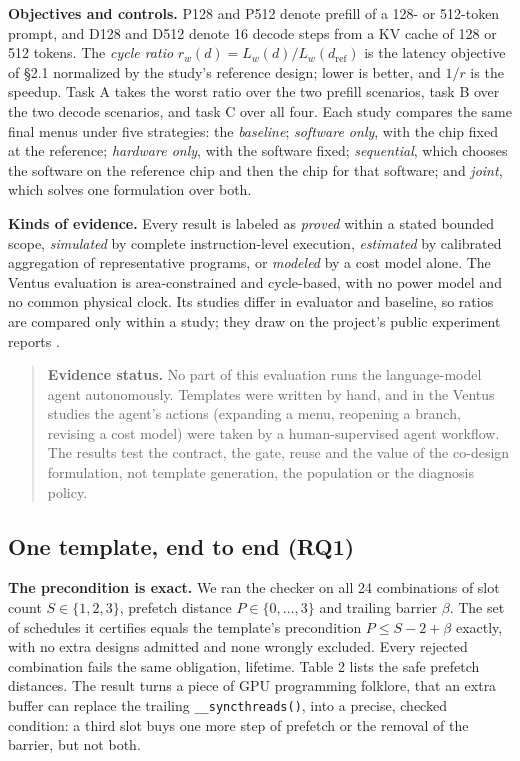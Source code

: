 \documentclass[11pt]{article}
\begin{document}
\textbf{Objectives and controls.} P128 and P512 denote prefill of a 128- or 512-token prompt, and D128 and D512 denote 16 decode steps from a KV cache of 128 or 512 tokens. The \emph{cycle ratio} \(r_w(d)=L_w(d)/L_w(d_{\mathrm{ref}})\) is the latency objective of §2.1 normalized by the study's reference design; lower is better, and \(1/r\) is the speedup. Task A takes the worst ratio over the two prefill scenarios, task B over the two decode scenarios, and task C over all four. Each study compares the same final menus under five strategies: the \emph{baseline}; \emph{software only}, with the chip fixed at the reference; \emph{hardware only}, with the software fixed; \emph{sequential}, which chooses the software on the reference chip and then the chip for that software; and \emph{joint}, which solves one formulation over both.

\textbf{Kinds of evidence.} Every result is labeled as \emph{proved} within a stated bounded scope, \emph{simulated} by complete instruction-level execution, \emph{estimated} by calibrated aggregation of representative programs, or \emph{modeled} by a cost model alone. The Ventus evaluation is area-constrained and cycle-based, with no power model and no common physical clock. Its studies differ in evaluator and baseline, so ratios are compared only within a study; they draw on the project's public experiment reports \cite{r96,r97,r98,r99,r100}.

\begin{quote}
\textbf{Evidence status.} No part of this evaluation runs the language-model agent autonomously. Templates were written by hand, and in the Ventus studies the agent's actions (expanding a menu, reopening a branch, revising a cost model) were taken by a human-supervised agent workflow. The results test the contract, the gate, reuse and the value of the co-design formulation, not template generation, the population or the diagnosis policy.
\end{quote}

\hypertarget{one-template-end-to-end-rq1}{%
\subsection{One template, end to end (RQ1)}\label{one-template-end-to-end-rq1}}

\textbf{The precondition is exact.} We ran the checker on all 24 combinations of slot count \(S\in\{1,2,3\}\), prefetch distance \(P\in\{0,\dots,3\}\) and trailing barrier \(\beta\). The set of schedules it certifies equals the template's precondition \(P\le S-2+\beta\) exactly, with no extra designs admitted and none wrongly excluded. Every rejected combination fails the same obligation, lifetime. Table 2 lists the safe prefetch distances. The result turns a piece of GPU programming folklore, that an extra buffer can replace the trailing \texttt{\_\_syncthreads()}, into a precise, checked condition: a third slot buys one more step of prefetch or the removal of the barrier, but not both.
\end{document}
